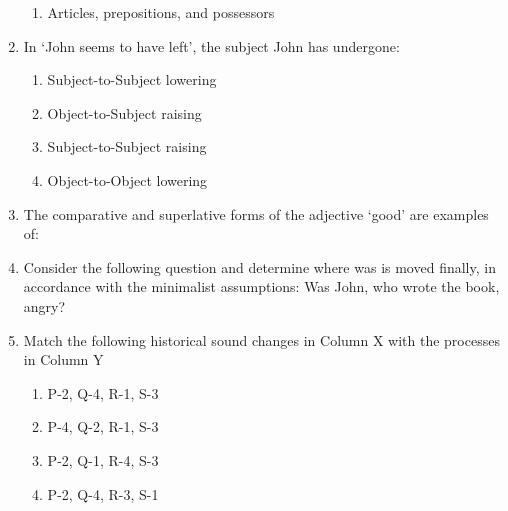 \documentclass[12pt]{article}
\theoremstyle{remark}
\begin{document}
\begin{enumerate}
\begin{enumerate}
\item Articles, prepositions, and possessors
\end{enumerate}
\hfill{}
\item In ‘John seems to have left’, the subject John has undergone:
\begin{enumerate} 
\item Subject-to-Subject lowering
\item Object-to-Subject raising
\item Subject-to-Subject raising
\item Object-to-Object lowering
\end{enumerate}
\hfill{}
\item The comparative and superlative forms of the adjective ‘good’ are examples of:
\begin{enumerate}  \end{enumerate}
\hfill{}
\item Consider the following question and determine where was is moved finally, in accordance with the minimalist assumptions: Was John, who wrote the book, angry?
\begin{enumerate}  \end{enumerate}
\hfill{}
\item Match the following historical sound changes in Column X with the processes in Column Y
\begin{table}[H]
    \centering

    \caption{}
    \label{tab:ling_q50}
\end{table}
\begin{enumerate} 
\item P-2, Q-4, R-1, S-3
\item P-4, Q-2, R-1, S-3
\item P-2, Q-1, R-4, S-3
\item P-2, Q-4, R-3, S-1

\end{enumerate}
\end{enumerate}
\end{document}
